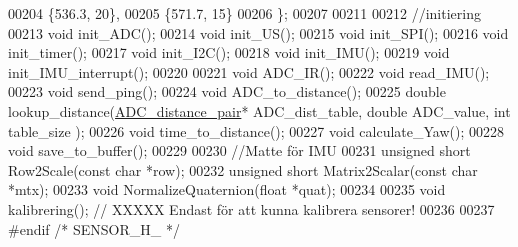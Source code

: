 \begin{DoxyCode}
00204     \{536.3, 20\},
00205     \{571.7, 15\}
00206 \};
00207 
00211 
00212 \textcolor{comment}{//initiering}
00213 \textcolor{keywordtype}{void} init\_ADC();
00214 \textcolor{keywordtype}{void} init\_US();
00215 \textcolor{keywordtype}{void} init\_SPI();
00216 \textcolor{keywordtype}{void} init\_timer();
00217 \textcolor{keywordtype}{void} init\_I2C();
00218 \textcolor{keywordtype}{void} init\_IMU();
00219 \textcolor{keywordtype}{void} init\_IMU\_interrupt();
00220 
00221 \textcolor{keywordtype}{void} ADC\_IR();
00222 \textcolor{keywordtype}{void} read\_IMU();
00223 \textcolor{keywordtype}{void} send\_ping();
00224 \textcolor{keywordtype}{void} ADC\_to\_distance();
00225 \textcolor{keywordtype}{double} lookup\_distance(\hyperlink{struct_a_d_c__distance__pair}{ADC\_distance\_pair}* ADC\_dist\_table, \textcolor{keywordtype}{double} ADC\_value, \textcolor{keywordtype}{int} table\_size
      );
00226 \textcolor{keywordtype}{void} time\_to\_distance();
00227 \textcolor{keywordtype}{void} calculate\_Yaw();
00228 \textcolor{keywordtype}{void} save\_to\_buffer();
00229 
00230 \textcolor{comment}{//Matte för IMU}
00231 \textcolor{keywordtype}{unsigned} \textcolor{keywordtype}{short} Row2Scale(\textcolor{keyword}{const} \textcolor{keywordtype}{char} *row);
00232 \textcolor{keywordtype}{unsigned} \textcolor{keywordtype}{short} Matrix2Scalar(\textcolor{keyword}{const} \textcolor{keywordtype}{char} *mtx);
00233 \textcolor{keywordtype}{void} NormalizeQuaternion(\textcolor{keywordtype}{float} *quat);
00234 
00235 \textcolor{keywordtype}{void} kalibrering();     \textcolor{comment}{// XXXXX Endast för att kunna kalibrera sensorer!}
00236 
00237 \textcolor{preprocessor}{#endif }\textcolor{comment}{/* SENSOR\_H\_ */}\textcolor{preprocessor}{}
\end{DoxyCode}
